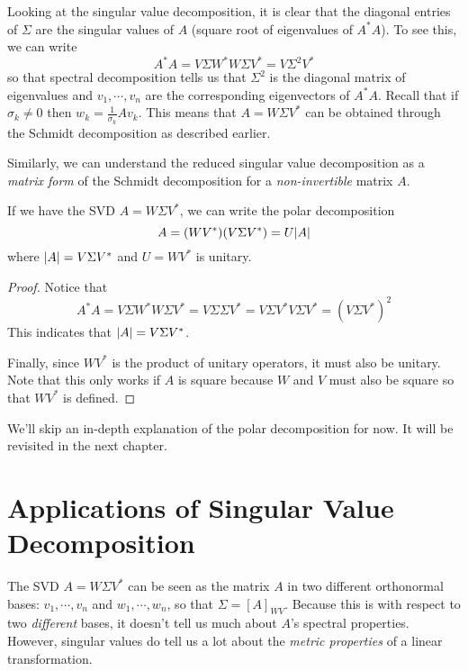 Looking at the singular value decomposition, it is clear that the diagonal entries of $\Sigma$ are the singular values of $A$ (square root of eigenvalues of $A^{*}A$). To see this, we can write 
$$A^{*} A = V \Sigma W^{*} W \Sigma V^{*} = V \Sigma^{2} V^{*}$$
so that spectral decomposition tells us that $\Sigma^{2}$ is the diagonal matrix of eigenvalues and $v_{1}, \cdots, v_{n}$ are the corresponding eigenvectors of $A^{*} A$. Recall that if $\sigma_{k} \neq 0$ then $w_{k} = \frac{1}{\sigma_{k}} Av_{k}$. This means that $A = W \Sigma V^{*}$ can be obtained through the Schmidt decomposition as described earlier. 

Similarly, we can understand the reduced singular value decomposition as a \textit{matrix form} of the Schmidt decomposition for a \textit{non-invertible} matrix $A$. 

\begin{theorem}
If we have the SVD $A = W \Sigma V^{*}$, we can write the polar decomposition
$$A = (WV^{*}) (V \Sigma V^{*}) = U \abs{A}$$
where $\abs{A} = V \Sigma V^{*}$ and $U = WV^{*}$ is unitary. 
\end{theorem}

\begin{proof}
Notice that 
$$A^{*} A = V \Sigma W^{*} W \Sigma V^{*} = V \Sigma \Sigma V^{*} = V \Sigma V^{*} V \Sigma V^{*} = (V \Sigma V^{*})^{2}$$
This indicates that $\abs{A} = V \Sigma V^{*}$. 

Finally, since $WV^{*}$ is the product of unitary operators, it must also be unitary. Note that this only works if $A$ is square because $W$ and $V$ must also be square so that $WV^{*}$ is defined. 
\end{proof}

We'll skip an in-depth explanation of the polar decomposition for now. It will be revisited in the next chapter. 

\section{Applications of Singular Value Decomposition}

The SVD $A = W \Sigma V^{*}$ can be seen as the matrix $A$ in two different orthonormal bases: $v_{1}, \cdots, v_{n}$ and $w_{1}, \cdots, w_{n}$, so that $\Sigma = [A]_{WV}$. Because this is with respect to two \textit{different} bases, it doesn't tell us much about $A$'s spectral properties. However, singular values do tell us a lot about the \textit{metric properties} of a linear transformation. 

